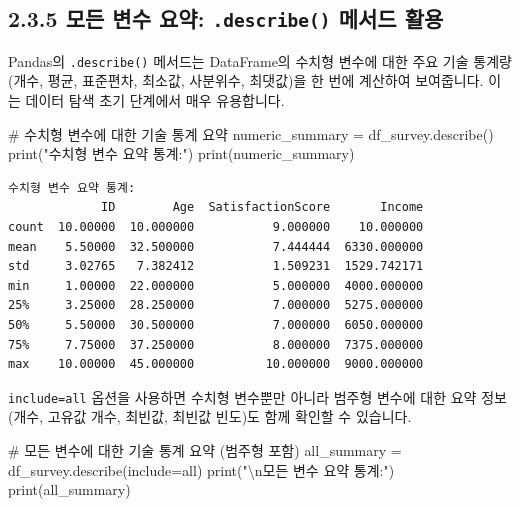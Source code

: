\documentclass[
  letterpaper,
]{book}
\newenvironment{Shaded}{\begin{snugshade}}{\end{snugshade}}
\newcommand{\BuiltInTok}[1]{\textcolor[rgb]{0.00,0.23,0.31}{#1}}
\newcommand{\CharTok}[1]{\textcolor[rgb]{0.13,0.47,0.30}{#1}}
\newcommand{\CommentTok}[1]{\textcolor[rgb]{0.37,0.37,0.37}{#1}}
\newcommand{\NormalTok}[1]{\textcolor[rgb]{0.00,0.23,0.31}{#1}}
\newcommand{\OperatorTok}[1]{\textcolor[rgb]{0.37,0.37,0.37}{#1}}
\newcommand{\StringTok}[1]{\textcolor[rgb]{0.13,0.47,0.30}{#1}}
\begin{document}
\subsection{\texorpdfstring{2.3.5 모든 변수 요약: \texttt{.describe()}
메서드
활용}{2.3.5 모든 변수 요약: .describe() 메서드 활용}}\label{uxbaa8uxb4e0-uxbcc0uxc218-uxc694uxc57d-.describe-uxba54uxc11cuxb4dc-uxd65cuxc6a9}

Pandas의 \texttt{.describe()} 메서드는 DataFrame의 수치형 변수에 대한
주요 기술 통계량(개수, 평균, 표준편차, 최소값, 사분위수, 최댓값)을 한
번에 계산하여 보여줍니다. 이는 데이터 탐색 초기 단계에서 매우
유용합니다.

\begin{Shaded}
\begin{Highlighting}[]
\CommentTok{\# 수치형 변수에 대한 기술 통계 요약}
\NormalTok{numeric\_summary }\OperatorTok{=}\NormalTok{ df\_survey.describe()}
\BuiltInTok{print}\NormalTok{(}\StringTok{"수치형 변수 요약 통계:"}\NormalTok{)}
\BuiltInTok{print}\NormalTok{(numeric\_summary)}
\end{Highlighting}
\end{Shaded}

\begin{verbatim}
수치형 변수 요약 통계:
             ID        Age  SatisfactionScore       Income
count  10.00000  10.000000           9.000000    10.000000
mean    5.50000  32.500000           7.444444  6330.000000
std     3.02765   7.382412           1.509231  1529.742171
min     1.00000  22.000000           5.000000  4000.000000
25%     3.25000  28.250000           7.000000  5275.000000
50%     5.50000  30.500000           7.000000  6050.000000
75%     7.75000  37.250000           8.000000  7375.000000
max    10.00000  45.000000          10.000000  9000.000000
\end{verbatim}

\texttt{include=\textquotesingle{}all\textquotesingle{}} 옵션을 사용하면
수치형 변수뿐만 아니라 범주형 변수에 대한 요약 정보(개수, 고유값 개수,
최빈값, 최빈값 빈도)도 함께 확인할 수 있습니다.

\begin{Shaded}
\begin{Highlighting}[]
\CommentTok{\# 모든 변수에 대한 기술 통계 요약 (범주형 포함)}
\NormalTok{all\_summary }\OperatorTok{=}\NormalTok{ df\_survey.describe(include}\OperatorTok{=}\StringTok{\textquotesingle{}all\textquotesingle{}}\NormalTok{)}
\BuiltInTok{print}\NormalTok{(}\StringTok{"}\CharTok{\textbackslash{}n}\StringTok{모든 변수 요약 통계:"}\NormalTok{)}
\BuiltInTok{print}\NormalTok{(all\_summary)}
\end{Highlighting}
\end{Shaded}
\end{document}

